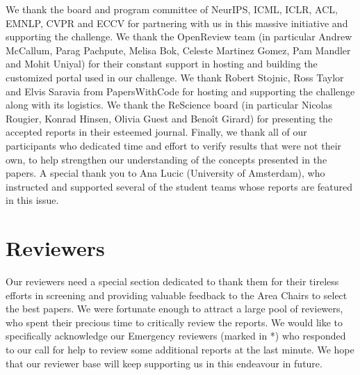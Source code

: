 We thank the board and program committee of NeurIPS, ICML, ICLR, ACL, EMNLP, CVPR and ECCV for partnering with us in this massive initiative and supporting the challenge. We thank the OpenReview team (in particular Andrew McCallum, Parag Pachpute, Melisa Bok, Celeste Martinez Gomez, Pam Mandler and Mohit Uniyal) for their constant support in hosting and building the customized portal used in our challenge. We thank Robert Stojnic, Ross Taylor and Elvis Saravia from PapersWithCode for hosting and supporting the challenge along with its logistics. We thank the ReScience board (in particular Nicolas Rougier, Konrad Hinsen, Olivia Guest and Benoît Girard) for presenting the accepted reports in their esteemed journal. Finally, we thank all of our participants who dedicated time and effort to verify results that were not their own, to help strengthen our understanding of the concepts presented in the papers.  A special thank you to Ana Lucic (University of Amsterdam), who instructed and supported several of the student teams whose reports are featured in this issue.

\section{Reviewers}

Our reviewers need a special section dedicated to thank them for their tireless efforts in screening and providing valuable feedback to the Area Chairs to select the best papers. We were fortunate enough to attract a large pool of reviewers, who spent their precious time to critically review the reports. We would like to specifically acknowledge  our Emergency reviewers (marked in *) who responded to our call for help to review some additional reports at the last minute. We hope that our reviewer base will keep supporting us in this endeavour in future.


